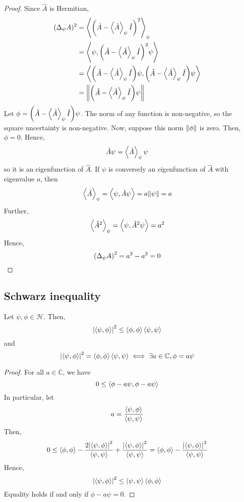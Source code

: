 \begin{proof}
	Since \( \hat A \) is Hermitian,
	\begin{align*}
		(\Delta_\psi A)^2 & = \left\langle{\qty(\hat A - \left\langle{\hat A}\right\rangle_\psi \hat I)^2}\right\rangle_\psi                                              \\
		                  & = \left\langle{\psi, \qty(\hat A - \left\langle{\hat A}\right\rangle_\psi \hat I)^2 \psi}\right\rangle                                        \\
		                  & = \left\langle{\qty(\hat A - \left\langle{\hat A}\right\rangle_\psi \hat I)\psi, \qty(\hat A - \left\langle{\hat A}\right\rangle_\psi \hat I) \psi}\right\rangle \\
		                  & = \norm{\qty(\hat A - \left\langle{\hat A}\right\rangle_\psi \hat I)\psi}
	\end{align*}
	Let \( \phi = \qty(\hat A - \left\langle{\hat A}\right\rangle_\psi \hat I)\psi \).
	The norm of any function is non-negative, so the square uncertainty is non-negative.
	Now, suppose this norm \( \norm{\phi} \) is zero.
	Then, \( \phi = 0 \).
	Hence,
	\[
		\hat A \psi = \left\langle{\hat A}\right\rangle_\psi \psi
	\]
	so it is an eigenfunction of \( \hat A \).
	If \( \psi \) is conversely an eigenfunction of \( \hat A \) with eigenvalue \( a \), then
	\[
		\left\langle{\hat A}\right\rangle_\psi = \left\langle{\psi, \hat A \psi}\right\rangle = a \norm{\psi} = a
	\]
	Further,
	\[
		\left\langle{\hat A^2}\right\rangle_\psi = \left\langle{\psi, \hat A^2 \psi}\right\rangle = a^2
	\]
	Hence,
	\[
		\qty(\Delta_\psi A)^2 = a^2 - a^2 = 0
	\]
\end{proof}

\subsection{Schwarz inequality}
\begin{theorem}
	Let \( \psi, \phi \in \mathcal H \).
	Then,
	\[
		\abs{\left\langle{\psi, \phi}\right\rangle}^2 \leq \left\langle{\phi, \phi}\right\rangle \left\langle{\psi, \psi}\right\rangle
	\]
	and
	\[
		\abs{\left\langle{\psi, \phi}\right\rangle}^2 = \left\langle{\phi, \phi}\right\rangle \left\langle{\psi, \psi}\right\rangle \iff \exists a \in \mathbb C, \phi = a \psi
	\]
\end{theorem}
\begin{proof}
	For all \( a \in \mathbb C \), we have
	\[
		0 \leq \left\langle{\phi - a \psi, \phi - a \psi}\right\rangle
	\]
	In particular, let
	\[
		a = \frac{\left\langle{\psi, \phi}\right\rangle}{\left\langle{\psi, \psi}\right\rangle}
	\]
	Then,
	\[
		0 \leq \left\langle{\phi, \phi}\right\rangle - \frac{2 \abs{\left\langle{\psi, \phi}\right\rangle}^2}{\left\langle{\psi, \psi}\right\rangle} + \frac{\abs{\left\langle{\psi, \phi}\right\rangle}^2}{\left\langle{\psi, \psi}\right\rangle} = \left\langle{\phi, \phi}\right\rangle - \frac{\abs{\left\langle{\psi, \phi}\right\rangle}^2}{\left\langle{\psi, \psi}\right\rangle}
	\]
	Hence,
	\[
		\abs{\left\langle{\psi, \phi}\right\rangle}^2 \leq \left\langle{\psi, \psi}\right\rangle \left\langle{\phi, \phi}\right\rangle
	\]
	Equality holds if and only if \( \phi - a \psi = 0 \).
\end{proof}

